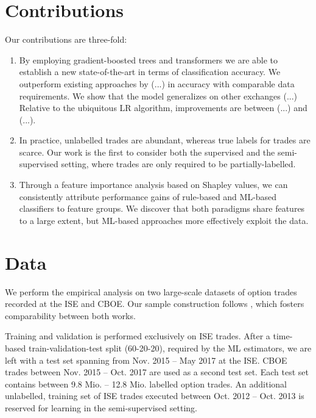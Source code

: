 \section{Contributions}

Our contributions are three-fold: 
\begin{enumerate}[label=(\roman*),noitemsep]

\item By employing gradient-boosted trees and transformers we are able to establish a new state-of-the-art in terms of classification accuracy. We outperform existing approaches by (...) in accuracy with comparable data requirements. We show that the model generalizes on other exchanges (...) Relative to the ubiquitous \gls{LR} algorithm, improvements are between (...) and (...).
\item In practice, unlabelled trades are abundant, whereas true labels for trades are scarce. Our work is the first to consider both the supervised and the semi-supervised setting, where trades are only required to be partially-labelled.
\item Through a feature importance analysis based on Shapley values, we can consistently attribute performance gains of rule-based and \gls{ML}-based classifiers to feature groups. We discover that both paradigms share features to a large extent, but \gls{ML}-based approaches more effectively exploit the data.
\end{enumerate}

\section{Data}


We perform the empirical analysis on two large-scale datasets of option trades recorded at the \gls{ISE} and \gls{CBOE}. Our sample construction follows \textcite[][]{grauerOptionTradeClassification2022}, which fosters comparability between both works. 

Training and validation is performed exclusively on \gls{ISE} trades. After a time-based train-validation-test split (60-20-20), required by the \gls{ML} estimators, we are left with a test set spanning from Nov. 2015 -- May 2017 at the \gls{ISE}. \gls{CBOE} trades between Nov. 2015 -- Oct. 2017 are used as a second test set. Each test set contains between 9.8 Mio. --  12.8 Mio. labelled option trades. An additional unlabelled, training set of \gls{ISE} trades executed between Oct. 2012 -- Oct. 2013 is reserved for learning in the semi-supervised setting.


